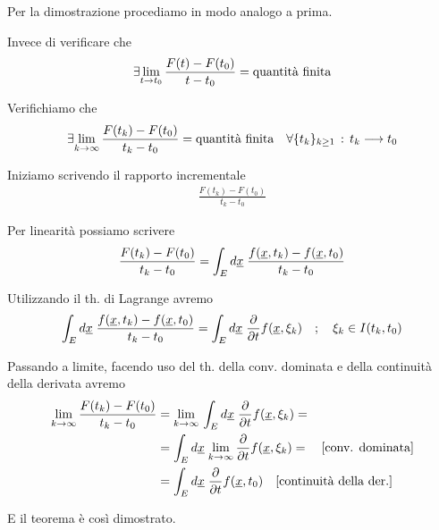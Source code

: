\bigskip
Per la dimostrazione procediamo in modo analogo a prima. 

Invece di verificare che
\begin{align}
	\exists \underset{t \rightarrow t_0}{\lim} \, \frac{F(t) - F(t_0)}{t-t_0} = \text{quantità finita}
\end{align}

Verifichiamo che
\begin{align}
	\exists \underset{k \rightarrow \infty}{\lim} \, \frac{F(t_k) - F(t_0)}{t_k-t_0} = \text{quantità finita} \quad \forall \{ t_k \}_{k\geq 1} \, : \, t_k \longrightarrow t_0
\end{align}

Iniziamo scrivendo il rapporto incrementale
\begin{align}
	\frac{F(t_k) - F(t_0)}{t_k - t_0}
\end{align}

Per linearità possiamo scrivere
\begin{align}
	\frac{F(t_k) - F(t_0)}{t_k - t_0} = \int_{E} d\underline{x} \; \frac{f(\underline{x},t_k) - f(\underline{x},t_0)}{t_k - t_0}
\end{align}

Utilizzando il th. di Lagrange avremo
\begin{align}
	\int_{E} d\underline{x} \; \frac{f(\underline{x},t_k) - f(\underline{x},t_0)}{t_k - t_0} = \int_{E} d\underline{x} \; \frac{\partial }{\partial t}f(\underline{x},\xi_k) \quad ; \quad \xi_k \in I(t_k,t_0)
\end{align}

Passando a limite, facendo uso del th. della conv. dominata e della continuità della derivata avremo
\begin{align}
	\underset{k \rightarrow \infty}{\lim} \, \frac{F(t_k) - F(t_0)}{t_k - t_0} {}&= \underset{k \rightarrow \infty}{\lim} \, \int_{E} d\underline{x} \; \frac{\partial }{\partial t}f(\underline{x},\xi_k) = \nonumber \\
	&= \int_{E} d\underline{x} \; \underset{k \rightarrow \infty}{\lim} \, \frac{\partial }{\partial t}f(\underline{x},\xi_k) =  \quad \text{[conv. dominata]}\nonumber \\
	&= \int_{E} d\underline{x} \;  \frac{\partial }{\partial t}f(\underline{x},t_0)  \quad \text{[continuità della der.]}
\end{align}

E il teorema è così dimostrato.

\begin{figure}[!htb]
\end{figure}
\newpage


